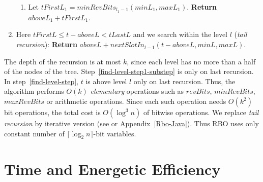 \documentclass{llncs}
\begin{document}
\begin{enumerate}
\begin{enumerate}
  \item 
  Let $tFirstL_1= minRevBits_{l_1-1}( minL_1, maxL_1)$. {\bf Return} $aboveL_1+tFirstL_1$.

  \end{enumerate}

\item 
Here $tFirstL\le t-aboveL <tLastL$ and we search within the level $l$ ({\em tail recursion}):
{\bf Return} $aboveL+nextSlotIn_{l-1}(t-aboveL, minL, maxL)$.

\end{enumerate}

The depth of the recursion is at most $k$, since each level has no more than 
a half of the nodes of the tree.
Step~\ref{find-level-step1-substep} is only on last recursion.
In step~\ref{find-level-step}, $t$ is above level $l$ only on last recursion.
Thus, the algorithm performs $O(k)$ {\em elementary} operations
such as $revBits$, $minRevBits$, $maxRevBits$ or arithmetic operations. 
Since each such operation  needs $O(k^2)$ bit operations,
the total cost is $O(\log^3 n)$ of bitwise operations.
We replace {\em tail recursion}  by iterative version 
(see \cite{RBO-WWW} or Appendix~\ref{Rbo-Java}).
Thus RBO uses only constant number of $\lceil\log_2 n\rceil$-bit variables.




\section{Time and Energetic Efficiency}\label{reliable-efficiency-section}
\end{document}
